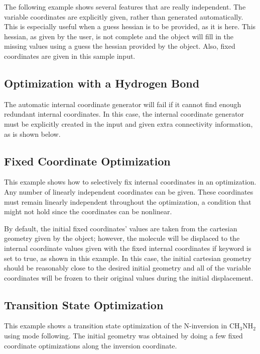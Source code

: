 The following example shows several features that are really independent.
The variable coordinates are explicitly given, rather than generated
automatically.  This is especially useful when a guess hessian is to be
provided, as it is here.  This hessian, as given by the user, is not
complete and the  object will fill in the missing
values using a guess the hessian provided by the 
object.  Also, fixed coordinates are given in this sample input.



\subsection{Optimization with a Hydrogen Bond}

The automatic internal coordinate generator will fail if it cannot find
enough redundant internal coordinates.  In this case, the internal
coordinate generator must be explicitly created in the input and given
extra connectivity information, as is shown below.



\subsection{Fixed Coordinate Optimization}
\label{fixedexample}

 This example shows how to selectively fix internal coordinates in an
optimization.  Any number of linearly independent coordinates can be given.
These coordinates must remain linearly independent throughout the
optimization, a condition that might not hold since the coordinates can be
nonlinear.

 By default, the initial fixed coordinates' values are taken from the
cartesian geometry given by the  object; however, the
molecule will be displaced to the internal coordinate values given with the
fixed internal coordinates if  keyword is set to
true, as shown in this example.  In this case, the initial cartesian
geometry should be reasonably close to the desired initial geometry and all
of the variable coordinates will be frozen to their original values during
the initial displacement.



\subsection{Transition State Optimization}
\label{tsexample}

This example shows a transition state optimization of the N-inversion in
$\mathrm{CH}_3\mathrm{NH}_2$ using mode following.  The initial geometry
was obtained by doing a few fixed coordinate optimizations along the
inversion coordinate.


